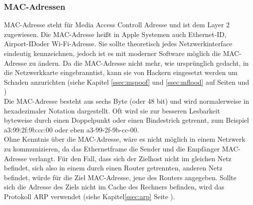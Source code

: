 \documentclass[12pt,a4paper]{report}
\begin{document}
\subsubsection{MAC-Adressen}
MAC-Adresse steht für Media Access Controll Adresse und ist dem Layer 2 zugewiesen. Die MAC-Adresse heißt in Apple Systemen auch \glqq Ethernet-ID\grqq , \glqq Airport-ID\grqq oder \glqq Wi-Fi-Adresse\grqq . Sie sollte theoretisch jedes Netzwerkinterface eindeutig kennzeichnen, jedoch ist es mit moderner Software möglich die MAC-Adresse zu ändern. Da die MAC-Adresse nicht mehr, wie ursprünglich gedacht, in die Netzwerkkarte \glqq eingebrannt\grqq ist, kann sie von Hackern eingesetzt werden um Schaden anzurichten (siehe Kapitel \ref{ssec:mspoof} und \ref{ssec:mflood} auf Seiten \pageref{ssec:mspoof} und \pageref{ssec:mflood})\\
Die MAC-Adresse besteht aus sechs Byte (oder 48 bit) und wird normalerweise in hexadezimaler Notation dargestellt. Oft wird sie zur besseren Lesbarkeit byteweise durch einen Doppelpunkt oder einen Bindestrich getrennt, zum Beispiel a3:99:2f:9b:cc:00 oder eben a3-99-2f-9b-cc-00.\\
Ohne Kenntnis über die MAC-Adresse, wäre es nicht möglich in einem Netzwerk zu kommunizieren, da das Ethernetframe die Sender und die Empfänger MAC-Adresse verlangt. Für den Fall, dass sich der Zielhost nicht im gleichen Netz befindet, sich also in einem durch einen Router getrennten, anderen Netz befindet, würde für die Ziel MAC-Adresse, jene des Routers angegeben. Sollte sich die Adresse des Ziels nicht im Cache des Rechners befinden, wird das Protokoll ARP verwendet (siehe Kapitel\ref{ssec:arp} Seite \pageref{ssec:arp}). 
\end{document}
